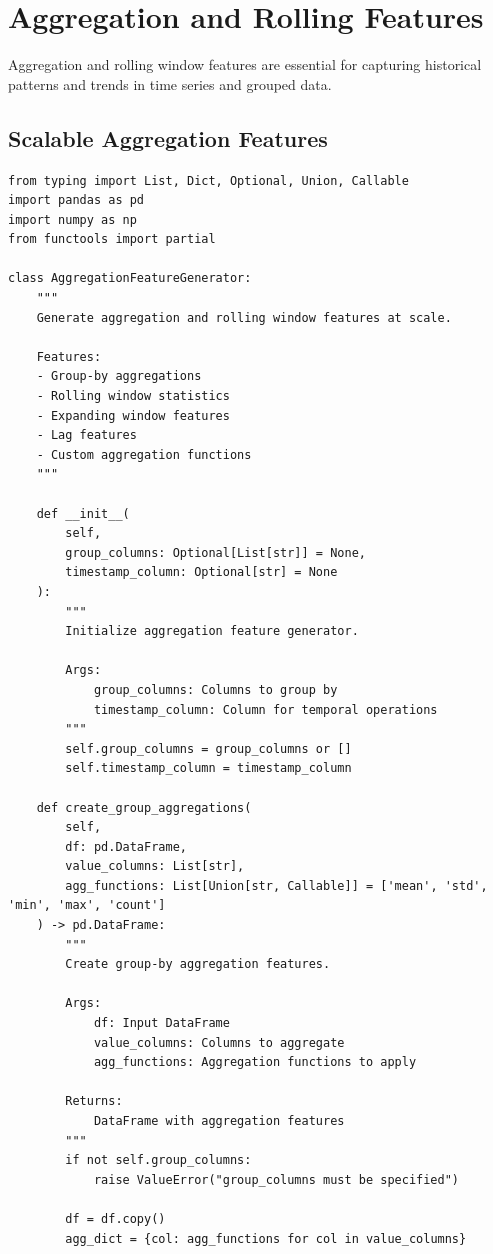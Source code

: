 \section{Aggregation and Rolling Features}

Aggregation and rolling window features are essential for capturing historical patterns and trends in time series and grouped data.

\subsection{Scalable Aggregation Features}

\begin{lstlisting}[style=python, caption={Scalable Aggregation and Rolling Window Features}]
from typing import List, Dict, Optional, Union, Callable
import pandas as pd
import numpy as np
from functools import partial

class AggregationFeatureGenerator:
    """
    Generate aggregation and rolling window features at scale.

    Features:
    - Group-by aggregations
    - Rolling window statistics
    - Expanding window features
    - Lag features
    - Custom aggregation functions
    """

    def __init__(
        self,
        group_columns: Optional[List[str]] = None,
        timestamp_column: Optional[str] = None
    ):
        """
        Initialize aggregation feature generator.

        Args:
            group_columns: Columns to group by
            timestamp_column: Column for temporal operations
        """
        self.group_columns = group_columns or []
        self.timestamp_column = timestamp_column

    def create_group_aggregations(
        self,
        df: pd.DataFrame,
        value_columns: List[str],
        agg_functions: List[Union[str, Callable]] = ['mean', 'std', 'min', 'max', 'count']
    ) -> pd.DataFrame:
        """
        Create group-by aggregation features.

        Args:
            df: Input DataFrame
            value_columns: Columns to aggregate
            agg_functions: Aggregation functions to apply

        Returns:
            DataFrame with aggregation features
        """
        if not self.group_columns:
            raise ValueError("group_columns must be specified")

        df = df.copy()
        agg_dict = {col: agg_functions for col in value_columns}


\end{lstlisting}
